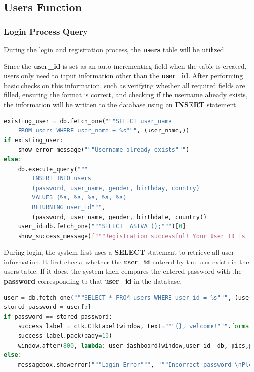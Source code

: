 \documentclass[12pt]{article}
\begin{document}
\subsection{Users Function}
\subsubsection{Login Process Query}
\par During the login and registration process, the \textbf{users} table will be utilized. 
\par Since the \textbf{user\_id} is set as an auto-incrementing field when the table is created, users only need to input information other than the \textbf{user\_id}. After performing basic checks on this information, such as verifying whether all required fields are filled, ensuring the format is correct, and checking if the username already exists, the information will be written to the database using an \textbf{INSERT} statement.

\begin{tcolorbox}[colframe=black, colback=white, boxrule=0.4mm, sharp corners=southwest, title=Excerpt of User Registration Code]
    \begin{lstlisting}[language=Python, breaklines=true]
existing_user = db.fetch_one("""SELECT user_name 
    FROM users WHERE user_name = %s""", (user_name,))
if existing_user:
    show_error_message("""Username already exists""")
else:
    db.execute_query(""" 
        INSERT INTO users 
        (password, user_name, gender, birthday, country)
        VALUES (%s, %s, %s, %s, %s) 
        RETURNING user_id""",
        (password, user_name, gender, birthdate, country))
    user_id=db.fetch_one("""SELECT LASTVAL();""")[0]
    show_success_message(f"""Registration successful! Your User ID is {user_id}. \nPlease remember your ID for the next login.""")
\end{lstlisting}
\end{tcolorbox}

\par During login, the system first uses a \textbf{SELECT} statement to retrieve all user information. It first checks whether the \textbf{user\_id} entered by the user exists in the users table. If it does, the system then compares the entered password with the \textbf{password} corresponding to that \textbf{user\_id} in the database.

\begin{tcolorbox}[colframe=black, colback=white, boxrule=0.4mm, sharp corners=southwest, title=Excerpt of User Login Code]
    \begin{lstlisting}[language=Python, breaklines=true]
user = db.fetch_one("""SELECT * FROM users WHERE user_id = %s""", (user_id,))
stored_password = user[5] 
if password == stored_password:
    success_label = ctk.CTkLabel(window, text="""{}, welcome!""".format(user[1]), font=("Arial", 20), text_color="green")
    success_label.pack(pady=10)
    window.after(800, lambda: user_dashboard(window,user_id, db, pics,pics1,pics2)) 
else:
    messagebox.showerror("""Login Error""", """Incorrect password!\nPlease try again!""")
\end{lstlisting}
\end{tcolorbox}
\end{document}
